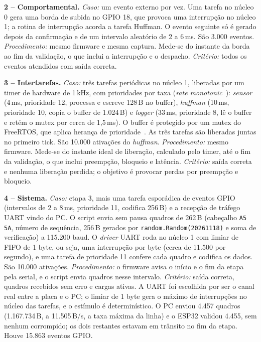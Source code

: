 \documentclass[11pt,a4paper]{article}
\newcommand{\ms}{\,ms}
\begin{document}
\textbf{2 -- Comportamental.} \textit{Caso:} um evento externo por vez. Uma
tarefa no núcleo 0 gera uma borda de subida no GPIO 18, que provoca uma
interrupção no núcleo 1; a rotina de interrupção acorda a tarefa Huffman. O
evento seguinte só é gerado depois da confirmação e de um intervalo aleatório
de 2 a 6\ms. São 3.000 eventos. \textit{Procedimento:} mesmo firmware e mesma
captura. Mede-se do instante da borda ao fim da validação, o que inclui a
interrupção e o despacho. \textit{Critério:} todos os eventos atendidos com
saída correta.

\textbf{3 -- Intertarefas.} \textit{Caso:} três tarefas periódicas no núcleo 1,
liberadas por um timer de hardware de 1\,kHz, com prioridades por taxa
(\textit{rate monotonic}~\cite{liu}): \textit{sensor} (4\ms, prioridade 12,
processa e escreve 128\,B no buffer), \textit{huffman} (10\ms, prioridade 10,
copia o buffer de 1.024\,B) e \textit{logger} (33\ms, prioridade 8, lê o buffer
e retém o mutex por cerca de 1,5\ms). O buffer é protegido por um mutex do
FreeRTOS, que aplica herança de prioridade~\cite{sha}. As três tarefas são
liberadas juntas no primeiro tick. São 10.000 ativações do \textit{huffman}.
\textit{Procedimento:} mesmo firmware. Mede-se do instante ideal de liberação,
calculado pelo timer, até o fim da validação, o que inclui preempção, bloqueio
e latência. \textit{Critério:} saída correta e nenhuma liberação perdida; o
objetivo é provocar perdas por preempção e bloqueio.

\textbf{4 -- Sistema.} \textit{Caso:} etapa 3, mais uma tarefa esporádica de
eventos GPIO (intervalos de 2 a 8\ms, prioridade 11, codifica 256\,B) e a
recepção de tráfego UART vindo do PC. O script envia sem pausa quadros de
262\,B (cabeçalho \texttt{A5 5A}, número de sequência, 256\,B gerados por
\texttt{random.Random(20261118)} e soma de verificação) a 115.200 baud. O
\textit{driver} UART roda no núcleo 1 com limiar de FIFO de 1 byte, ou seja,
uma interrupção por byte (cerca de 11.500 por segundo), e uma tarefa de
prioridade 11 confere cada quadro e codifica os dados. São 10.000 ativações.
\textit{Procedimento:} o firmware avisa o início e o fim da etapa pela serial,
e o script envia quadros nesse intervalo. \textit{Critério:} saída correta,
quadros recebidos sem erro e cargas ativas. A UART foi escolhida por ser o
canal real entre a placa e o PC; o limiar de 1 byte gera o máximo de
interrupções no núcleo das tarefas, e o estímulo é determinístico. O PC enviou
4.457 quadros (1.167.734\,B, a 11.505\,B/s, a taxa máxima da linha) e o ESP32
validou 4.455, sem nenhum corrompido; os dois restantes estavam em trânsito no
fim da etapa. Houve 15.863 eventos GPIO.
\end{document}
